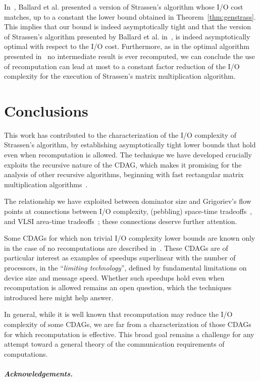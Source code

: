 \documentclass[a4paper,UKenglish]{lipics-v2016}
\newcommand{\io }{I/O }
\begin{document}
In~\cite{ballard2012communicationalg}, Ballard et al. presented a version of Strassen's algorithm whose \io cost matches, up to a constant the lower bound obtained in Theorem~\ref{thm:genstrass}. This implies that our bound is indeed asymptotically tight and that  the version of Strassen's algorithm presented by Ballard et al. in~\cite{ballard2012communicationalg}, is indeed asymptotically optimal with respect to the \io cost. Furthermore, as in the optimal algorithm presented in~\cite{ballard2012communicationalg} no intermediate result is ever recomputed, we can conclude the use of recomputation can lead at most to a constant factor reduction of the \io complexity for the execution of Strassen's matrix multiplication algorithm. 
	
\section{Conclusions}\label{sec:conlcusion}

This work has contributed to the characterization of the \io
complexity of Strassen's algorithm, by establishing asymptotically
tight lower bounds that hold even when recomputation is allowed.
The technique we have developed crucially exploits the recursive
nature of the CDAG, which makes it promising for the analysis of other
recursive algorithms, beginning with fast rectangular matrix
multiplication algorithms~\cite{le2012faster}.

The relationship we have exploited between dominator size and
Grigoriev's flow points at connections between \io complexity,
(pebbling) space-time tradeoffs~\cite{savage97models}, and VLSI
area-time tradeoffs~\cite{thompson79vlsistoc}; these connections
deserve further attention.

Some CDAGs for which non trivial \io complexity lower bounds are known
only in the case of no recomputations are described
in~\cite{bilardi1999processor}. These CDAGs are of particular interest
as examples of speedups superlinear with the number of processors, in
the ``\emph{limiting technology}'', defined by fundamental limitations on
device size and message speed.  Whether such speedups hold even when
recomputation is allowed remains an open question, which the
techniques introduced here might help answer.

In general, while it is well known that recomputation may reduce the
\io complexity of some CDAGs, we are far from a characterization of
those CDAGs for which recomputation is effective. This broad goal
remains a challenge for any attempt toward a general theory of the
communication requirements of computations.
\subparagraph*{Acknowledgements.}
\end{document}
